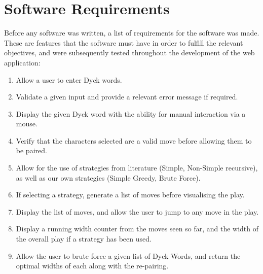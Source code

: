 \section{Software Requirements}
Before any software was written, a list of requirements for the software was made. These are features that the software must have in order to fulfill the relevant objectives, and were subsequently tested throughout the development of the web application:
\begin{enumerate}
    \item Allow a user to enter Dyck words.
    \item Validate a given input and provide a relevant error message if required.
    \item Display the given Dyck word with the ability for manual interaction via a mouse.
    \item Verify that the characters selected are a valid move before allowing them to be paired.
    \item Allow for the use of strategies from literature (Simple, Non-Simple recursive), as well as our own strategies (Simple Greedy, Brute Force).
    \item If selecting a strategy, generate a list of moves before visualising the play.
    \item Display the list of moves, and allow the user to jump to any move in the play.
    \item Display a running width counter from the moves seen so far, and the width of the overall play if a strategy has been used.
    \item Allow the user to brute force a given list of Dyck Words, and return the optimal widths of each along with the re-pairing.
\end{enumerate}
